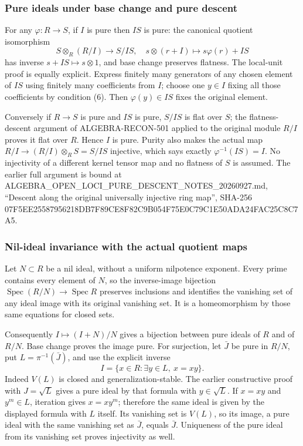 \subsubsection{Pure ideals under base change and pure descent}\label{pure-ideals-under-base-change-and-pure-descent}

For any \(\varphi:R\to S\), if \(I\) is pure then \(IS\) is pure: the canonical quotient isomorphism \[
S\otimes_R(R/I)\longrightarrow S/IS,\quad
s\otimes(r+I)\longmapsto s\varphi(r)+IS
\] has inverse \(s+IS\mapsto s\otimes1\), and base change preserves flatness. The local-unit proof is equally explicit. Express finitely many generators of any chosen element of \(IS\) using finitely many coefficients from \(I\); choose one \(y\in I\) fixing all those coefficients by condition (6). Then \(\varphi(y)\in IS\) fixes the original element.

Conversely if \(R\to S\) is pure and \(IS\) is pure, \(S/IS\) is flat over \(S\); the flatness-descent argument of ALGEBRA-RECON-501 applied to the original module \(R/I\) proves it flat over \(R\). Hence \(I\) is pure. Purity also makes the actual map \(R/I\to (R/I)\otimes_RS=S/IS\) injective, which says exactly \(\varphi^{-1}(IS)=I\). No injectivity of a different kernel tensor map and no flatness of \(S\) is assumed. The earlier full argument is bound at ALGEBRA\_OPEN\_LOCI\_PURE\_DESCENT\_NOTES\_20260927.md, ``Descent along the original universally injective ring map'', SHA-256 07F5EE25587956218DB7F89CE8F82C9B054F75E0C79C1E50ADA24FAC25C8C7A5.

\subsubsection{Nil-ideal invariance with the actual quotient maps}\label{nil-ideal-invariance-with-the-actual-quotient-maps}

Let \(N\subset R\) be a nil ideal, without a uniform nilpotence exponent. Every prime contains every element of \(N\), so the inverse-image bijection \(\operatorname{Spec}(R/N)\to\operatorname{Spec}R\) preserves inclusions and identifies the vanishing set of any ideal image with its original vanishing set. It is a homeomorphism by those same equations for closed sets.

Consequently \(I\mapsto(I+N)/N\) gives a bijection between pure ideals of \(R\) and of \(R/N\). Base change proves the image pure. For surjection, let \(\bar J\) be pure in \(R/N\), put \(L=\pi^{-1}(\bar J)\), and use the explicit inverse \[
I=\{x\in R:\exists y\in L,\ x=xy\}.
\] Indeed \(V(L)\) is closed and generalization-stable. The earlier constructive proof with \(J=\sqrt L\) gives a pure ideal by that formula with \(y\in\sqrt L\). If \(x=xy\) and \(y^m\in L\), iteration gives \(x=xy^m\); therefore the same ideal is given by the displayed formula with \(L\) itself. Its vanishing set is \(V(L)\), so its image, a pure ideal with the same vanishing set as \(\bar J\), equals \(\bar J\). Uniqueness of the pure ideal from its vanishing set proves injectivity as well.

